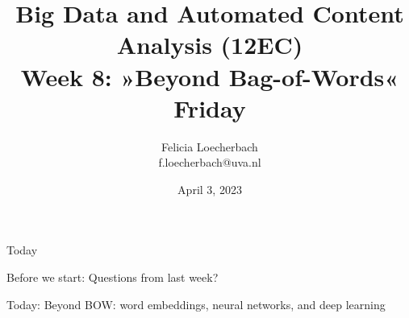 \documentclass[compress]{beamer}
\begin{document}
\title[Big Data and Automated Content Analysis]{\textbf{Big Data and Automated Content Analysis (12EC)} 
\\Week 8: »Beyond Bag-of-Words«
\\Friday}
\author[Felicia Loecherbach]{Felicia Loecherbach\\ \footnotesize{f.loecherbach@uva.nl \\}}
\date{April 3, 2023}


\begin{frame}{}
	\titlepage
\end{frame}

\begin{frame}{Today}
	\tableofcontents
\end{frame}
\begin{frame}[standout]
Before we start: Questions from last week?
\end{frame}


\begin{frame}[standout]
Today: Beyond BOW: word embeddings, neural networks, and deep learning
\end{frame}









\begin{frame}
\printbibliography
\end{frame}
\end{document}
